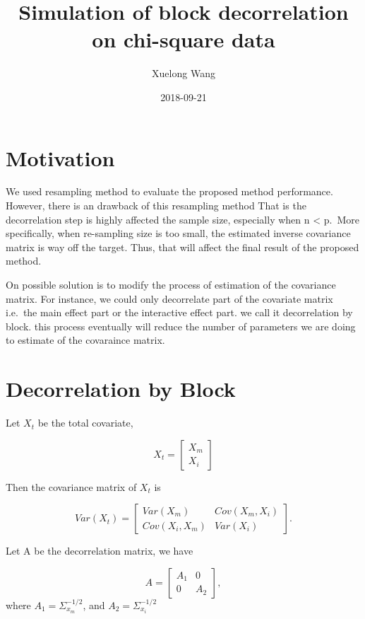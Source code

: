 \documentclass[]{article}
\title{Simulation of block decorrelation on chi-square data}
\author{Xuelong Wang}
\date{2018-09-21}
\begin{document}
\maketitle

{
\setcounter{tocdepth}{2}
\tableofcontents
}
\section{Motivation}\label{motivation}

We used resampling method to evaluate the proposed method performance.
However, there is an drawback of this resampling method That is the
decorrelation step is highly affected the sample size, especially when n
\textless{} p.~More specifically, when re-sampling size is too small,
the estimated inverse covariance matrix is way off the target. Thus,
that will affect the final result of the proposed method.

On possible solution is to modify the process of estimation of the
covariance matrix. For instance, we could only decorrelate part of the
covariate matrix i.e.~the main effect part or the interactive effect
part. we call it decorrelation by block. this process eventually will
reduce the number of parameters we are doing to estimate of the
covaraince matrix.

\section{Decorrelation by Block}\label{decorrelation-by-block}

Let \(X_t\) be the total covariate,

\[
  X_t = \begin{bmatrix}
          X_m \\
          X_i
        \end{bmatrix}
\]

Then the covariance matrix of \(X_t\) is

\[
  Var(X_t) = \begin{bmatrix}
              Var(X_m) & Cov(X_m, X_i) \\
              Cov(X_i, X_m) & Var(X_i) 
             \end{bmatrix}.
\]

Let A be the decorrelation matrix, we have

\[
  A = \begin{bmatrix}
       A_1 & 0 \\
       0 & A_2 
      \end{bmatrix},
\] where \(A_1 = \Sigma_{x_m}^{-1/2}\), and
\(A_2 = \Sigma_{x_i}^{-1/2}\)
\end{document}
